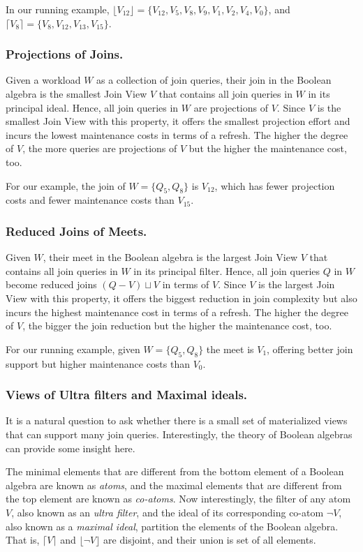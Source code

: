 \documentclass[sigconf]{acmart}
\begin{document}
In our running example, $\lfloor V_{12}\rfloor=\{V_{12},V_5,V_8,V_9, V_1,V_2,V_4,V_0\}$, and $\lceil V_8\rceil=\{V_8,V_{12},V_{13},V_{15}\}$.

\subsubsection{Projections of Joins.} Given a workload $W$ as a collection of join queries, their join in the Boolean algebra is the smallest Join View $V$ that contains all join queries in $W$ in its principal ideal. Hence, all join queries in $W$ are projections of $V$. Since $V$ is the smallest Join View with this property, it offers the smallest projection effort and incurs the lowest maintenance costs in terms of a refresh. The higher the degree of $V$, the more queries are projections of $V$ but the higher the maintenance cost, too.

For our example, the join of $W=\{Q_5,Q_8\}$ is $V_{12}$, which has fewer projection costs and fewer maintenance costs than $V_{15}$.

\subsubsection{Reduced Joins of Meets.} Given $W$, their meet in the Boolean algebra is the largest Join View $V$ that contains all join queries in $W$ in its principal filter. Hence, all join queries $Q$ in $W$ become reduced joins $(Q-V)\sqcup V$ in terms of $V$. Since $V$ is the largest Join View with this property, it offers the biggest reduction in join complexity but also incurs the highest maintenance cost in terms of a refresh. The higher the degree of $V$, the bigger the join reduction but the higher the maintenance cost, too.

For our running example, given $W=\{Q_5,Q_8\}$ the meet is $V_1$, offering better join support but higher maintenance costs than $V_{0}$.

\subsubsection{Views of Ultra filters and Maximal ideals.} It is a natural question to ask whether there is a small set of materialized views that can support many join queries. Interestingly, the theory of Boolean algebras can provide some insight here.

The minimal elements that are different from the bottom element of a Boolean algebra are known as \emph{atoms}, and the maximal elements that are different from the top element are known as \emph{co-atoms}. Now interestingly, the filter of any atom $V$, also known as an \emph{ultra filter}, and the ideal of its corresponding co-atom $\neg V$, also known as a \emph{maximal ideal}, partition the elements of the Boolean algebra. That is, $\lceil V\rceil$ and $\lfloor \neg V\rfloor$ are disjoint, and their union is set of all elements.
\end{document}
